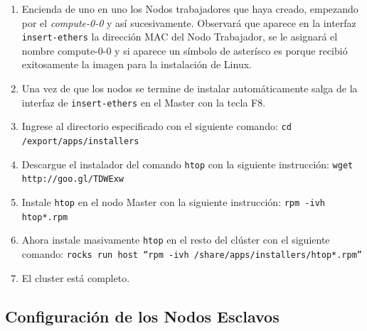 \begin{enumerate}
\item Encienda de uno en uno los Nodos trabajadores que haya creado, empezando por el \textit{compute-0-0} y así sucesivamente. Observará que aparece en la interfaz \texttt{insert-ethers} la dirección MAC del Nodo Trabajador, se le asignará el nombre compute-0-0 y si aparece un símbolo de asterísco es porque recibió exitosamente la imagen para la instalación de Linux.

\item Una vez de que los nodos se termine de instalar automáticamente salga de la interfaz de \texttt{insert-ethers} en el Master con la tecla F8.

\item Ingrese al directorio especificado con el siguiente comando: \texttt{cd /export/apps/installers}

\item Descargue el instalador del comando \texttt{htop} con la siguiente instrucción: \texttt{wget http://goo.gl/TDWExw}

\item Instale \texttt{htop} en el nodo Master con la siguiente instrucción: \texttt{rpm -ivh htop*.rpm}

\item Ahora instale masivamente \texttt{htop} en el resto del clúster con el siguiente comando: \texttt{rocks run host ``rpm -ivh /share/apps/installers/htop*.rpm''}

\item El cluster está completo.

\end{enumerate}

\subsection{Configuración de los Nodos Esclavos}

